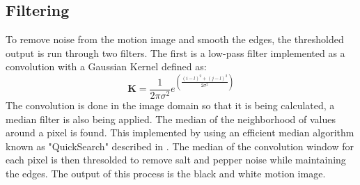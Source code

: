 \documentclass[journal]{IEEEtran}
\begin{document}
\subsection{Filtering}
To remove noise from the motion image and smooth the edges, the thresholded output is run through two filters.
The first is a low-pass filter implemented as a convolution with a Gaussian Kernel defined as:
$$
\mathbf{K} = \frac{1}{2\pi \sigma^{2}}e^{\left(\frac{\left(i-l\right)^{2}+\left(j-l\right)^{2}}{2 \sigma^{2}}\right)}
$$
The convolution is done in the image domain so that it is being calculated,  a median filter is also being 
applied. The median of the neighborhood of values around a pixel is found. This implemented by using an efficient
median algorithm known as "QuickSearch" described in \cite{num_in_c}. The median of the convolution window
for each pixel is then thresolded to remove salt and pepper noise while maintaining the edges. The output
of this process is the black and white motion image.
\end{document}
